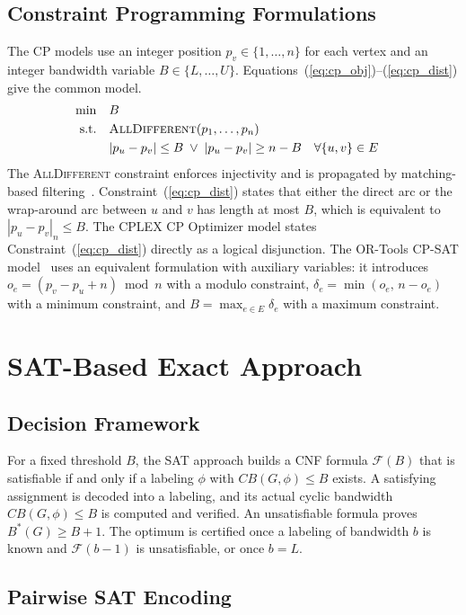 \documentclass[a4paper,fleqn]{cas-sc}
\begin{document}
\subsection{Constraint Programming Formulations}

The CP models use an integer position $p_v\in\{1,\dots,n\}$ for each vertex and an integer bandwidth variable $B\in\{L,\dots,U\}$. Equations~(\ref{eq:cp_obj})--(\ref{eq:cp_dist}) give the common model.
\begin{align}
    \min\quad & B \label{eq:cp_obj}\\
    \text{s.t.}\quad & \textsc{AllDifferent}(p_1,\dots,p_n) \label{eq:cp_alldiff}\\
    & |p_u-p_v|\le B\;\lor\;|p_u-p_v|\ge n-B && \forall \{u,v\}\in E \label{eq:cp_dist}
\end{align}
The \textsc{AllDifferent} constraint enforces injectivity and is propagated by matching-based filtering~\citep{regin1994}. Constraint~(\ref{eq:cp_dist}) states that either the direct arc or the wrap-around arc between $u$ and $v$ has length at most $B$, which is equivalent to $|p_u-p_v|_n\le B$. The CPLEX CP Optimizer model states Constraint~(\ref{eq:cp_dist}) directly as a logical disjunction. The OR-Tools CP-SAT model~\citep{ortools} uses an equivalent formulation with auxiliary variables: it introduces $o_e=(p_v-p_u+n)\bmod n$ with a modulo constraint, $\delta_e=\min(o_e,\,n-o_e)$ with a minimum constraint, and $B=\max_{e\in E}\delta_e$ with a maximum constraint.

\section{SAT-Based Exact Approach}
\label{sec:sat}

\subsection{Decision Framework}

For a fixed threshold $B$, the SAT approach builds a CNF formula $\mathcal{F}(B)$ that is satisfiable if and only if a labeling $\phi$ with $CB(G,\phi)\le B$ exists. A satisfying assignment is decoded into a labeling, and its actual cyclic bandwidth $CB(G,\phi)\le B$ is computed and verified. An unsatisfiable formula proves $B^*(G)\ge B+1$. The optimum is certified once a labeling of bandwidth $b$ is known and $\mathcal{F}(b-1)$ is unsatisfiable, or once $b=L$.

\subsection{Pairwise SAT Encoding}
\label{sec:pairwise}
\end{document}
